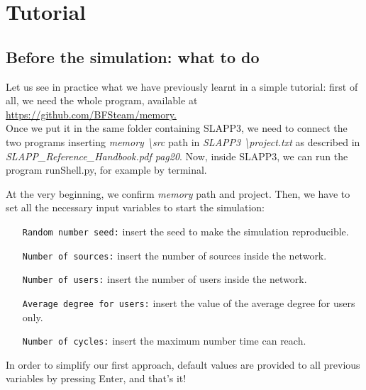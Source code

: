 \section{Tutorial}
\subsection{Before the simulation: what to do}
Let us see in practice what we have previously learnt in a simple tutorial: first of all, we need the whole program, available at \url{https://github.com/BFSteam/memory.}\\
Once we put it in the same folder containing SLAPP3, we need to connect the two programs inserting \textit{memory \textbackslash src} path in \textit{SLAPP3 \textbackslash project.txt} as described in 
\\ \textit{SLAPP\_Reference\_Handbook.pdf pag20}.
Now, inside SLAPP3, we can run the program runShell.py, for example by terminal.

At the very beginning, we confirm \textit{memory} path and project. Then, we have to set all the necessary input variables to start the simulation:
\begin{itemize}
\item[\texttt{Random number seed:}] insert the seed to make the simulation reproducible.
\item[\texttt{Number of sources:}]insert the number of sources inside the network.
\item[\texttt{Number of users:}]insert the number of users inside the network.
\item[\texttt{Average degree for users:}]insert the value of the average degree for users only.
\item[\texttt{Number of cycles:}]insert the maximum number time can reach.
\end{itemize}

In order to simplify our first approach, default values are provided to all previous variables by pressing Enter, and that's it!\\

